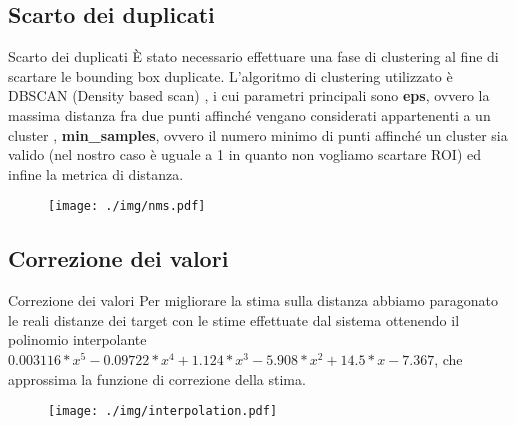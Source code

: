 \documentclass[10pt]{beamer}
\begin{document}
	\subsection{Scarto dei duplicati}\label{subsec:Scarto-dei-duplicati}

	\begin{frame}[allowframebreaks]{Scarto dei duplicati}
		È stato necessario effettuare una fase di clustering al fine di
		scartare le bounding box duplicate. L'algoritmo di clustering
		utilizzato è DBSCAN (Density based scan) \cite{dbscan}, i cui parametri
		principali sono \textbf{eps}, ovvero la massima distanza fra due punti
		affinché vengano considerati appartenenti a un cluster ,
		\textbf{min\_samples}, ovvero il numero minimo di punti affinché un
		cluster sia valido (nel nostro caso è uguale a 1 in quanto non vogliamo
		scartare ROI) ed infine la metrica di distanza.
		
		\begin{figure}[H]
			\centering
			\texttt{[image: ./img/nms.pdf]}
		\end{figure}
	\end{frame}

	\subsection{Correzione dei valori}\label{subsec:Correzione-dei-valori}
	\begin{frame}{Correzione dei valori}
		Per migliorare la stima sulla distanza abbiamo paragonato le reali
		distanze dei target con le stime effettuate dal sistema ottenendo il
		polinomio interpolante $0.003116*x^5 - 0.09722*x^4 + 1.124*x^3
		-5.908*x^2 + 14.5*x-7.367$, che approssima la funzione di correzione della stima. 
		
		\begin{figure}[H]
			\centering
			\texttt{[image: ./img/interpolation.pdf]}
			\label{fig:interpolation}
		\end{figure}
	\end{frame}

\end{document}
